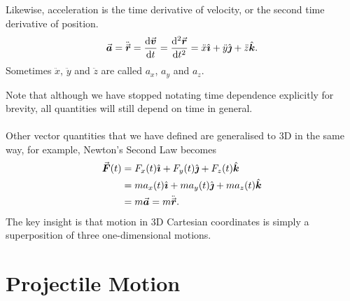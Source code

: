 \documentclass[../newtonian_mechanics.tex]{subfiles}
\begin{document}
        \begin{definition}
            Likewise, acceleration is the time derivative of velocity, or the second time derivative of position.
            \begin{equation}
                \vec{\boldsymbol a}=\ddot{\vec{\boldsymbol r}}=\frac{\mathrm{d}\vec{\boldsymbol v}}{\mathrm{d}t}=\frac{\mathrm{d}^2\vec{\boldsymbol r}}{\mathrm{d}t^2}=\ddot{x}\hat{\boldsymbol{\imath}}+\ddot{y}\hat{\boldsymbol{\jmath}}+\ddot{z}\hat{\boldsymbol{k}}.
            \end{equation}
            Sometimes $\ddot{x}$, $\ddot{y}$ and $\ddot{z}$ are called $a_x$, $a_y$ and $a_z$.
        \end{definition}
        Note that although we have stopped notating time dependence explicitly for brevity, all quantities will still depend on time in general.

        \paragraph{}
        Other vector quantities that we have defined are generalised to 3D in the same way, for example, Newton's Second Law becomes
        \begin{align*}
            \vec{\boldsymbol F}(t)&=F_x(t)\hat{\boldsymbol{\imath}}+F_y(t)\hat{\boldsymbol{\jmath}}+F_z(t)\hat{\boldsymbol{k}}\\
            &=ma_x(t)\hat{\boldsymbol{\imath}}+ma_y(t)\hat{\boldsymbol{\jmath}}+ma_z(t)\hat{\boldsymbol{k}} \\
            &=m\vec{\boldsymbol a}=m\ddot{\vec{\boldsymbol r}}.
        \end{align*}
        The key insight is that motion in 3D Cartesian coordinates is simply a superposition of three one-dimensional motions.

    \section{Projectile Motion}
\end{document}
